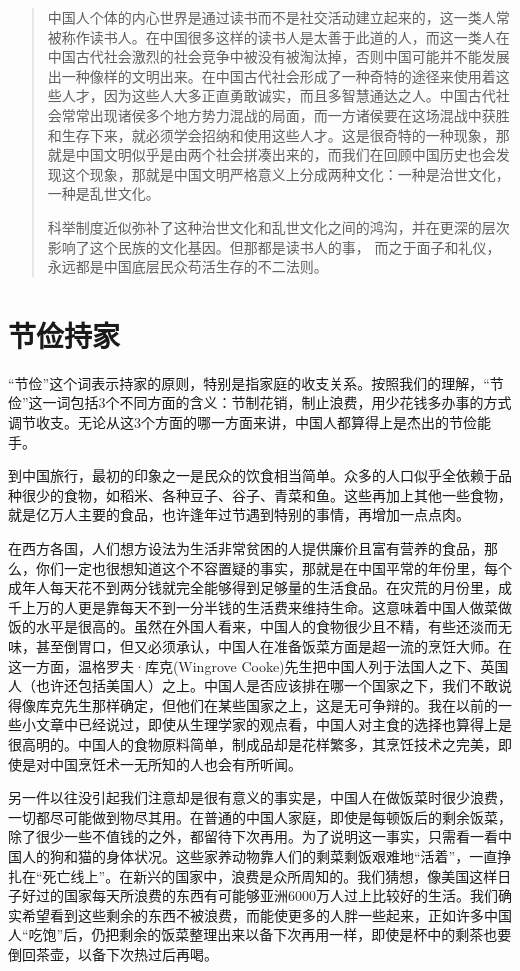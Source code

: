 \documentclass[12pt,oneside]{book}
\begin{document}
\begin{common-format}
\begin{quotation}
中国人个体的内心世界是通过读书而不是社交活动建立起来的，这一类人常被称作读书人。在中国很多这样的读书人是太善于此道的人，而这一类人在中国古代社会激烈的社会竞争中被没有被淘汰掉，否则中国可能并不能发展出一种像样的文明出来。在中国古代社会形成了一种奇特的途径来使用着这些人才，因为这些人大多正直勇敢诚实，而且多智慧通达之人。中国古代社会常常出现诸侯多个地方势力混战的局面，而一方诸侯要在这场混战中获胜和生存下来，就必须学会招纳和使用这些人才。这是很奇特的一种现象，那就是中国文明似乎是由两个社会拼凑出来的，而我们在回顾中国历史也会发现这个现象，那就是中国文明严格意义上分成两种文化：一种是治世文化，一种是乱世文化。

科举制度近似弥补了这种治世文化和乱世文化之间的鸿沟，并在更深的层次影响了这个民族的文化基因。但那都是读书人的事， 而之于面子和礼仪，永远都是中国底层民众苟活生存的不二法则。
\end{quotation}


\chapter{节俭持家}
“节俭”这个词表示持家的原则，特别是指家庭的收支关系。按照我们的理解，“节俭”这一词包括3个不同方面的含义：节制花销，制止浪费，用少花钱多办事的方式调节收支。无论从这3个方面的哪一方面来讲，中国人都算得上是杰出的节俭能手。 

到中国旅行，最初的印象之一是民众的饮食相当简单。众多的人口似乎全依赖于品种很少的食物，如稻米、各种豆子、谷子、青菜和鱼。这些再加上其他一些食物，就是亿万人主要的食品，也许逢年过节遇到特别的事情，再增加一点点肉。 

在西方各国，人们想方设法为生活非常贫困的人提供廉价且富有营养的食品，那么，你们一定也很想知道这个不容置疑的事实，那就是在中国平常的年份里，每个成年人每天花不到两分钱就完全能够得到足够量的生活食品。在灾荒的月份里，成千上万的人更是靠每天不到一分半钱的生活费来维持生命。这意味着中国人做菜做饭的水平是很高的。虽然在外国人看来，中国人的食物很少且不精，有些还淡而无味，甚至倒胃口，但又必须承认，中国人在准备饭菜方面是超一流的烹饪大师。在这一方面，温格罗夫·库克(Wingrove Cooke)先生把中国人列于法国人之下、英国人（也许还包括美国人）之上。中国人是否应该排在哪一个国家之下，我们不敢说得像库克先生那样确定，但他们在某些国家之上，这是无可争辩的。我在以前的一些小文章中已经说过，即使从生理学家的观点看，中国人对主食的选择也算得上是很高明的。中国人的食物原料简单，制成品却是花样繁多，其烹饪技术之完美，即使是对中国烹饪术一无所知的人也会有所听闻。 

另一件以往没引起我们注意却是很有意义的事实是，中国人在做饭菜时很少浪费，一切都尽可能做到物尽其用。在普通的中国人家庭，即使是每顿饭后的剩余饭菜，除了很少一些不值钱的之外，都留待下次再用。为了说明这一事实，只需看一看中国人的狗和猫的身体状况。这些家养动物靠人们的剩菜剩饭艰难地“活着”，一直挣扎在“死亡线上”。在新兴的国家中，浪费是众所周知的。我们猜想，像美国这样日子好过的国家每天所浪费的东西有可能够亚洲6000万人过上比较好的生活。我们确实希望看到这些剩余的东西不被浪费，而能使更多的人胖一些起来，正如许多中国人“吃饱”后，仍把剩余的饭菜整理出来以备下次再用一样，即使是杯中的剩茶也要倒回茶壶，以备下次热过后再喝。 


\end{common-format}
\end{document}
